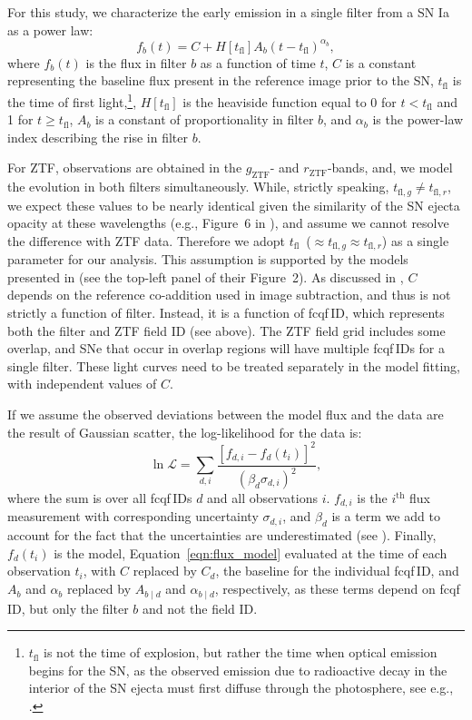 \documentclass[twocolumn]{./aastex63}
\newcommand{\rztf}{$r_\mathrm{ZTF}$}
\newcommand{\gztf}{$g_\mathrm{ZTF}$}
\newcommand{\tfl}{$t_\mathrm{fl}$}
\begin{document}
For this study, we characterize the early emission in a single filter from a
SN Ia as a power law:
%
\begin{equation}
    f_b(t) = C + H[t_\mathrm{fl}] A_b (t - t_\mathrm{fl})^{\alpha_b},
    \label{eqn:flux_model}
\end{equation}
%
where $f_b(t)$ is the flux in filter $b$ as a function of time $t$, $C$ is a
constant representing the baseline flux present in the reference image prior
to the SN, $t_\mathrm{fl}$ is the time of first light,\footnote{$t_\mathrm{fl}$ is not the time of
explosion, but rather the time when optical emission begins for the SN, as
the observed emission due to radioactive decay in the interior of the SN
ejecta must first diffuse through the photosphere, see e.g.,
\citet{Piro13,Piro14}.}, $H[t_\mathrm{fl}]$ is the heaviside function equal
to 0 for $t < t_\mathrm{fl}$ and 1 for $t \ge t_\mathrm{fl}$, $A_b$ is a
constant of proportionality in filter $b$, and $\alpha_b$ is the power-law
index describing the rise in filter $b$.

For ZTF, observations are obtained in the \gztf- and \rztf-bands, and, we model
the evolution in both filters simultaneously. While, strictly speaking,
$t_{\mathrm{fl}, g} \ne t_{\mathrm{fl}, r}$, we expect these values to be nearly
identical given the similarity of the SN ejecta opacity at these wavelengths
(e.g., Figure~6 in \citealt{Magee18}), and assume we cannot resolve the
difference with ZTF data. Therefore we adopt \tfl\ ($\approx t_{\mathrm{fl}, g}
\approx t_{\mathrm{fl}, r}$) as a single parameter for our analysis. This
assumption is supported by the models presented in \citet{Magee19} (see the
top-left panel of their Figure~2). As discussed in \citet{Yao19}, $C$ depends on
the reference co-addition used in image subtraction, and thus is not strictly a
function of filter. Instead, it is a function of fcqf\,ID, which represents both
the filter and ZTF field ID (see above). The ZTF field grid includes some
overlap, and SNe that occur in overlap regions will have multiple fcqf\,IDs for a
single filter. These light curves need to be treated separately in the model
fitting, with independent values of $C$.

If we assume the observed deviations between the model flux and the data are the
result of Gaussian scatter, the log-likelihood for the data is:
%
\begin{equation}
    \ln \mathscr{L} = \sum_{d,i} \frac{[f_{d,i} - f_d(t_i)]^2}{(\beta_d \sigma_{d,i})^2},
\end{equation}
%
where the sum is over all fcqf\,IDs $d$ and all observations $i$. $f_{d,i}$
is the $i^\mathrm{th}$ flux measurement with corresponding uncertainty
$\sigma_{d,i}$, and $\beta_d$ is a term we add to account for the fact that
the uncertainties are underestimated (see \citealt{Yao19}). Finally,
$f_d(t_i)$ is the model, Equation~\ref{eqn:flux_model} evaluated at the time
of each observation $t_i$, with $C$ replaced by $C_d$, the baseline for the
individual fcqf\,ID, and $A_b$ and $\alpha_b$ replaced by $A_{b\mid d}$ and
$\alpha_{b\mid d}$, respectively, as these terms depend on fcqf\,ID, but
only the filter $b$ and not the field ID.
\end{document}
